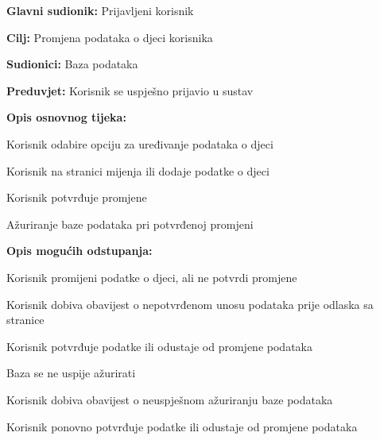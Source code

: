 					\eject

					\noindent {}
					\begin{packed_item}
	
						\item \textbf{Glavni sudionik: }Prijavljeni korisnik
						\item  \textbf{Cilj:} Promjena podataka o djeci korisnika
						\item  \textbf{Sudionici:} Baza podataka
						\item  \textbf{Preduvjet:} Korisnik se uspješno prijavio u sustav
						\item  \textbf{Opis osnovnog tijeka:}
						
						\item[] \begin{packed_enum}
							\item Korisnik odabire opciju za uređivanje podataka o djeci
							\item Korisnik na stranici mijenja ili dodaje podatke o djeci
							\item Korisnik potvrđuje promjene
							\item Ažuriranje baze podataka pri potvrđenoj promjeni
						\end{packed_enum}

						\item  \textbf{Opis mogućih odstupanja:}

						\item[] \begin{packed_item}
							\item[2.a] Korisnik promijeni podatke o djeci, ali ne potvrdi promjene
							\item[] \begin{packed_enum}
								
								\item Korisnik dobiva obavijest o nepotvrđenom unosu podataka prije \newline odlaska sa stranice
								\item Korisnik potvrđuje podatke ili odustaje od promjene podataka
							
							\end{packed_enum}	
							\item[4.a] Baza se ne uspije ažurirati
							\item[] \begin{packed_enum}
							
								\item Korisnik dobiva obavijest o neuspješnom ažuriranju baze podataka
								\item Korisnik ponovno potvrđuje podatke ili odustaje od promjene \newline podataka
							\end{packed_enum}
						\end{packed_item}
						
					\end{packed_item}

